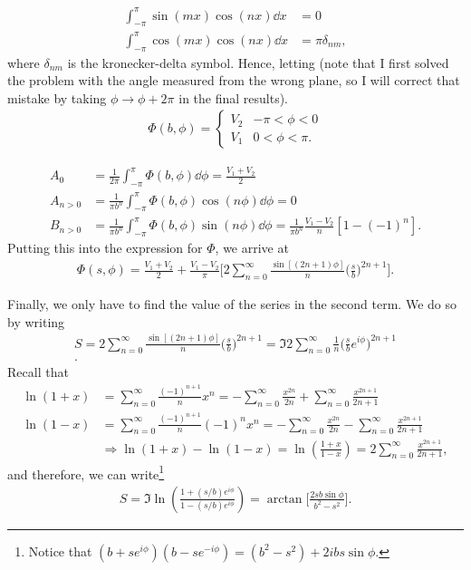 {\begin{align}
    \int_{-\pi}^{\pi} \sin(mx)\cos(nx) \dd{x} &= 0 \\
    \int_{-\pi}^{\pi} \cos(mx)\cos(nx) \dd{x} &= \pi \delta_{nm}
,\end{align}
where $\delta_{nm}$ is the kronecker-delta symbol.
Hence, letting (note that I first solved the problem with the angle measured from the wrong plane, so I will correct that mistake by taking $\phi \rightarrow \phi + 2\pi$ in the final results).
\begin{eqnarray}
   \Phi(b,\phi) = \begin{cases}
       V_2 & -\pi < \phi < 0 \\
       V_1 & 0 < \phi < \pi
   .\end{cases}
\end{eqnarray}

\begin{align}
    A_0 &= \frac{1}{2\pi} \int_{-\pi}^{\pi} \Phi(b,\phi) \dd{\phi} = \frac{V_1 + V_2}{2} \\
    A_{n>0} &= \frac{1}{\pi b^{n}} \int_{-\pi}^{\pi} \Phi(b,\phi) \cos(n\phi) \dd{\phi} = 0 \\
    B_{n>0} &= \frac{1}{\pi b^{n}} \int_{-\pi}^{\pi} \Phi(b,\phi) \sin(n\phi) \dd{\phi} = \frac{1}{\pi b^{n}} \frac{V_1 - V_2}{n} [1 - (-1)^{n}]
.\end{align}
Putting this into the expression for $\Phi$, we arrive at
\begin{eqnarray}
    \Phi(s,\phi) = \frac{V_1 + V_2}{2} + \frac{V_1 - V_2}{\pi} \Bigg[ 2 \sum_{n=0}^{\infty} \frac{\sin[(2n+1)\phi]}{n} \Big( \frac{s}{b} \Big)^{2n+1} \Bigg]
.\end{eqnarray}

Finally, we only have to find the value of the series in the second term.
We do so by writing
\begin{eqnarray}
    S = 2\sum_{n=0}^{\infty} \frac{\sin[(2n+1) \phi]}{n} \Big( \frac{s}{b} \Big)^{2n+1} = \Im{ 2\sum_{n=0}^{\infty} \frac{1}{n} \Big( \frac{s}{b} e^{i\phi} \Big)^{2n+1} } \\
.\end{eqnarray}
Recall that
\begin{align}
    \ln(1 + x) &= \sum_{n=0}^{\infty} \frac{(-1)^{n+1}}{n} x^{n} = -\sum_{n=0}^{\infty} \frac{x^{2n}}{2n} + \sum_{n=0}^{\infty} \frac{x^{2n+1}}{2n+1} \\
    \ln(1 - x) &= \sum_{n=0}^{\infty} \frac{(-1)^{n+1}}{n} (-1)^{n} x^{n} = -\sum_{n=0}^{\infty} \frac{x^{2n}}{2n} - \sum_{n=0}^{\infty} \frac{x^{2n+1}}{2n+1} \\
    &\Rightarrow \ln(1 + x) - \ln(1 - x) =\ln( \frac{1 + x}{1-x} ) = 2 \sum_{n=0}^{\infty} \frac{x^{2n+1}}{2n + 1}
,\end{align}
and therefore, we can write\footnote{Notice that $(b+s e^{i\phi})(b - s e^{-i\phi}) = (b^2 - s^2) + 2i b s \sin{\phi}$.}
\begin{eqnarray}
    S = \Im{ \ln( \frac{1 + (s/b)e^{i\phi}}{1 - (s/b)e^{i\phi}} ) } = \arctan\Bigg[ \frac{2 s b \sin{\phi}}{b^2 - s^2} \Bigg]
.\end{eqnarray}

}
